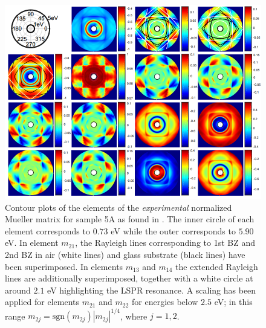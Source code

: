 \begin{figure}[h!]  %
    \centering
    \includegraphics[width=\linewidth, trim=0cm 0cm 0cm 0cm, clip]{figures/ch4/S5A/expdata/S5A_MM_rot_55.png}
    \caption{Contour plots of the elements of the \emph{experimental} normalized Mueller matrix for sample 5A as found in \cite{Brakstad:15}. The inner circle of each element corresponds to $0.73$ eV while the outer corresponds to $5.90$ eV. In element $m_{21}$, the Rayleigh lines corresponding to 1st BZ and 2nd BZ in air (white lines) and glass substrate (black lines) have been superimposed. In elements $m_{13}$ and $m_{14}$ the extended Rayleigh lines are additionally superimposed, together with a white circle at around $2.1$ eV highlighting the LSPR resonance. A scaling has been applied for elements $m_{21}$ and $m_{22}$ for energies below $2.5$ eV; in this range $m_{2j}=\text{sgn}(m_{2j})|m_{2j}|^{1/4}$, where $j=1,2$.}%
    \label{fig:S5A_contour_MM_exp}
\end{figure}
